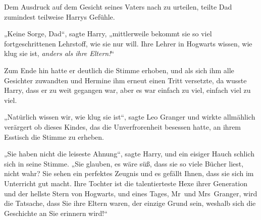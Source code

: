 Dem Ausdruck auf dem Gesicht seines Vaters nach zu urteilen, teilte Dad zumindest teilweise Harrys Gefühle.

„Keine Sorge, Dad“, sagte Harry, „mittlerweile bekommt sie so viel fortgeschrittenen Lehrstoff, wie sie nur will. Ihre Lehrer in Hogwarts wissen, wie klug sie ist, \emph{anders als ihre Eltern!}“

Zum Ende hin hatte er deutlich die Stimme erhoben, und als sich ihm alle Gesichter zuwandten und Hermine ihm erneut einen Tritt versetzte, da wusste Harry, dass er zu weit gegangen war, aber es war einfach zu viel, einfach viel zu viel.

„Natürlich wissen wir, wie klug sie ist“, sagte Leo Granger und wirkte allmählich verärgert ob dieses Kindes, das die Unverfrorenheit besessen hatte, an ihrem Esstisch die Stimme zu erheben.

„Sie haben nicht die leiseste Ahnung“, sagte Harry, und ein eisiger Hauch schlich sich in seine Stimme.
„Sie glauben, es wäre süß, dass sie so viele Bücher liest, nicht wahr? Sie sehen ein perfektes Zeugnis und es gefällt Ihnen, dass sie sich im Unterricht gut macht. Ihre Tochter ist die talentierteste Hexe ihrer Generation und der hellste Stern von Hogwarts, und eines Tages, Mr~und Mrs~Granger, wird die Tatsache, dass Sie ihre Eltern waren, der einzige Grund sein, weshalb sich die Geschichte an Sie erinnern wird!“

